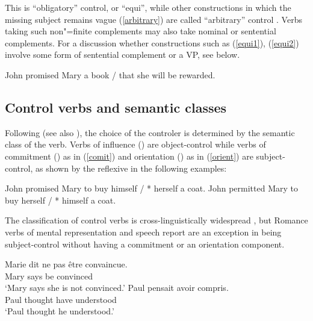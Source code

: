 \documentclass[output=paper
                ,modfonts
                ,nonflat
	        ,collection
	        ,collectionchapter
	        ,collectiontoclongg
 	        ,biblatex
                ,babelshorthands
                ,newtxmath
                ,draftmode
                ,colorlinks, citecolor=brown
]{./langsci/langscibook}
\begin{document}
This is ``obligatory'' control, or ``equi'', while other constructions in which the missing subject remains vague (\ref{arbitrary}) are called ``arbitrary'' control \citep{Bresnan1982}.
Verbs taking such non"=finite complements may also take nominal or sentential complements. For a discussion whether constructions such as (\ref{equi1}), (\ref{equi2}) involve some form of sentential complement or a VP, see below.

\begin{exe}
	\ex John promised Mary a book / that she will be rewarded.
\end{exe}
 
\subsection{Control verbs and semantic classes}

Following \citet{PollardandSag1992} (see also \citealt{JackendoffandCulicover2003}), the choice of the controler is determined by the semantic class of the verb.  Verbs of influence () are object-control
while verbs of commitment () as in (\ref{comit}) and orientation () as in (\ref{orient}) are subject-control, as shown by the reflexive in the following examples:

\begin{exe}
	\ex \begin{xlist}
	\ex John promised Mary to buy himself / * herself a coat. \label{comit}
   \ex 	John permitted Mary to buy herself / * himself a coat.\label{orient}
 \end{xlist}
 \end{exe}
 
  The classification of control verbs is cross-linguistically widespread \citep{VanValinandLapolla1997}, but Romance verbs of mental representation and speech report are an exception in being subject-control without having a commitment or an orientation component.


\begin{exe}
\ex \begin{xlist}
\ex \gll Marie dit {ne pas} \^etre convaincue. \\
Mary says  be convinced \\
\glt `Mary says she is not convinced.'	
\ex \gll Paul pensait  avoir compris. \\
Paul thought have understood \\
\glt `Paul thought he understood.'
 \end{xlist}
\end{exe}
\end{document}
